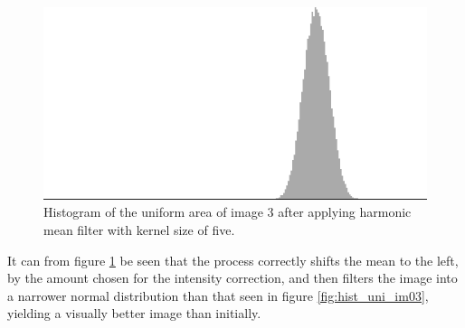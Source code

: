 \begin{figure}[H]
\centering
\includegraphics[width= 0.9 \linewidth]{../code/images/histogram_uniform_harmonic_03}
\caption{Histogram of the uniform area of image 3 after applying harmonic mean filter with kernel size of five.}
\label{fig:hist_uni_har_im03}
\end{figure}


It can from figure \ref{fig:hist_uni_har_im03} be seen that the process correctly shifts the mean to the left, by the amount chosen for the intensity correction, and then filters the image into a narrower normal distribution than that seen in figure \ref{fig:hist_uni_im03}, yielding a visually better image than initially.





